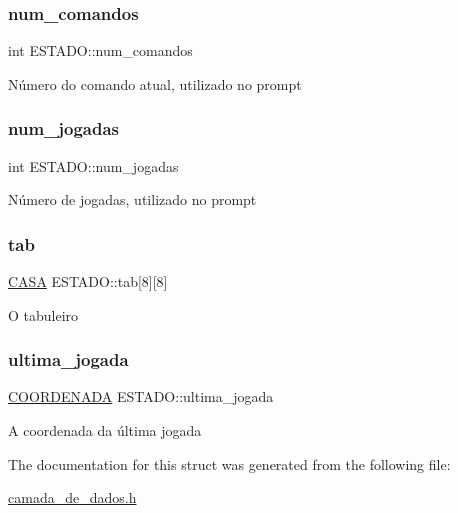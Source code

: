 \subsubsection{\texorpdfstring{num\+\_\+comandos}{num\_comandos}}
{\footnotesize\ttfamily int E\+S\+T\+A\+D\+O\+::num\+\_\+comandos}

Número do comando atual, utilizado no prompt \mbox{\label{structESTADO_a261495728744647e618b4e623f5a4b7a}} 
\subsubsection{\texorpdfstring{num\+\_\+jogadas}{num\_jogadas}}
{\footnotesize\ttfamily int E\+S\+T\+A\+D\+O\+::num\+\_\+jogadas}

Número de jogadas, utilizado no prompt \mbox{\label{structESTADO_ab56f0f1be16954d3768b4174d14c087d}} 
\subsubsection{\texorpdfstring{tab}{tab}}
{\footnotesize\ttfamily \hyperlink{camada__de__dados_8h_aba91601f16d4c485b2d9b8c429f27039}{C\+A\+SA} E\+S\+T\+A\+D\+O\+::tab\mbox{[}8\mbox{]}\mbox{[}8\mbox{]}}

O tabuleiro \mbox{\label{structESTADO_a4896a5c5c1f40b43fb795623327e3f47}} 
\subsubsection{\texorpdfstring{ultima\+\_\+jogada}{ultima\_jogada}}
{\footnotesize\ttfamily \hyperlink{structCOORDENADA}{C\+O\+O\+R\+D\+E\+N\+A\+DA} E\+S\+T\+A\+D\+O\+::ultima\+\_\+jogada}

A coordenada da última jogada 

The documentation for this struct was generated from the following file\+:\begin{DoxyCompactItemize}
\item 
\hyperlink{camada__de__dados_8h}{camada\+\_\+de\+\_\+dados.\+h}\end{DoxyCompactItemize}
